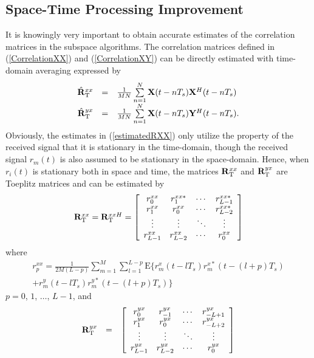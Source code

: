 \documentclass[a4paper,10pt,fleqn,twocolumn]{IEEEtran}
\newcommand{\bX}{{\bf X}}
\newcommand{\bY}{{\bf Y}}
\begin{document}
\subsection{Space-Time Processing Improvement}
It is knowingly very important to obtain accurate estimates of the
correlation matrices in the subspace algorithms. The correlation
matrices defined in (\ref{CorrelationXX}) and
(\ref{CorrelationXY}) can be directly estimated with time-domain
averaging expressed by
\begin{equation}
\begin{array}{rcl}
\hat{\mathbf{R}}_{\rm T}^{xx}&=&\frac{1}{MN}\sum\limits_{n=1}^{N}\bX(t-nT_s)\bX^{H}(t-nT_s)\\
\hat{\mathbf{R}}_{\rm
T}^{yx}&=&\frac{1}{MN}\sum\limits_{n=1}^{N}\bX(t-nT_s)\bY^{H}(t-nT_s).
\end{array}\label{estimatedRXX}\label{estimatedRYX}
\end{equation}
\noindent Obviously, the estimates in (\ref{estimatedRXX}) only
utilize the property of the received signal that it is stationary
in the time-domain, though the received signal $r_m(t)$ is also
assumed to be stationary in the space-domain. Hence, when $r_i(t)$
is stationary both in space and time, the matrices
$\mathbf{R}_{\rm T}^{xx}$ and $\mathbf{R}_{\rm T}^{yx}$ are
Toeplitz matrices and can be estimated by
\begin{equation}
\begin{array}{l}
\mathbf{R}_{\rm T}^{xx}=\mathbf{R}_{\rm
T}^{xxH}=\left[\begin{array}{cccc} r_0^{xx} & r_1^{xx\ast} &
\cdots & r_{L-1}^{xx\ast}\\ r_1^{xx} & r_0^{xx} &
\cdots & r_{L-2}^{xx\ast}\\ \vdots & \vdots & \ddots & \vdots\\
r_{L-1}^{xx} & r_{L-2}^{xx} & \cdots & r_0^{xx}
\end{array}\right]
\end{array}
\end{equation}
\noindent where
\begin{equation}
\begin{array}{r}
r_p^{xx}=\frac{1}{2M(L-p)}\sum\limits_{m=1}^{M}\sum\limits_{l=1}^{L-p}\mbox{E}\{r_m^x(t-lT_s)r_m^{x\ast}(t-(l+p)T_s)\\
+r_m^y(t-lT_s)r_m^{y\ast}(t-(l+p)T_s)\}
\end{array}
\end{equation}
\noindent $p=0$, $1$, $\ldots$, $L-1$, and
\begin{equation}
\begin{array}{rll}
\mathbf{R}_{\rm T}^{yx}&=&\left[\begin{array}{cccc} r_0^{yx} &
r_{-1}^{yx} & \cdots & r_{-L+1}^{yx}\\ r_1^{yx} & r_0^{yx} &
\cdots & r_{-L+2}^{yx}\\ \vdots & \vdots & \ddots & \vdots\\
r_{L-1}^{yx} & r_{L-2}^{yx} & \cdots & r_0^{yx}
\end{array}\right]
\end{array}
\end{equation}
\end{document}
